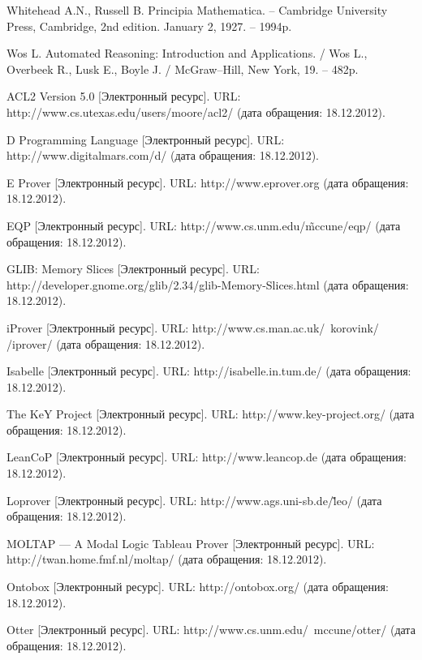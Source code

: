 \begin{thebibliography}{99}
 Whitehead A.N., Russell B. Principia Mathematica. -- Cambridge University Press, Cambridge, 2nd edition. January 2, 1927. -- 1994p.

 Wos L. Automated Reasoning: Introduction and Applications. / Wos L., Overbeek R., Lusk E.,  Boyle J. / McGraw--Hill,  New York, 19. -- 482p.


 ACL2 Version 5.0 [Электронный ресурс]. URL: http://www.cs.utexas.edu/users/moore/acl2/ (дата обращения: 18.12.2012).

 D Programming Language [Электронный ресурс]. URL: http://www.digitalmars.com/d/ (дата обращения: 18.12.2012).

 E Prover [Электронный ресурс]. URL: http://www.eprover.org (дата обращения: 18.12.2012).

 EQP [Электронный ресурс]. URL: http://www.cs.unm.edu/\~mccune/eqp/ (дата обращения: 18.12.2012).

 GLIB: Memory Slices [Электронный ресурс]. URL: http://developer.gnome.org/glib/2.34/glib-Memory-Slices.html (дата обращения: 18.12.2012).

 iProver [Электронный ресурс]. URL: http://www.cs.man.ac.uk/~korovink/\\/iprover/ (дата обращения: 18.12.2012).

 Isabelle [Электронный ресурс]. URL: http://isabelle.in.tum.de/ (дата обращения: 18.12.2012).

 The KeY Project [Электронный ресурс]. URL: http://www.key-project.org/ (дата обращения: 18.12.2012).

 LeanCoP [Электронный ресурс]. URL: http://www.leancop.de (дата обращения: 18.12.2012).

 Loprover [Электронный ресурс]. URL: http://www.ags.uni-sb.de/\~leo/ (дата обращения: 18.12.2012).

 MOLTAP — A Modal Logic Tableau Prover [Электронный ресурс]. URL: http://twan.home.fmf.nl/moltap/ (дата обращения: 18.12.2012).

 Ontobox [Электронный ресурс]. URL: http://ontobox.org/ (дата обращения: 18.12.2012).

 Otter [Электронный ресурс]. URL: http://www.cs.unm.edu/~mccune/ot\-ter/ (дата обращения: 18.12.2012).


\end{thebibliography}
